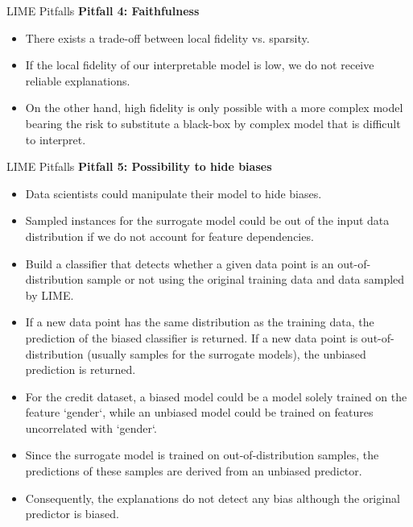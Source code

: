\documentclass[aspectratio=169]{../latex_main/tntbeamer}  %
\begin{document}
\begin{frame}[c]{LIME Pitfalls }
\textbf{Pitfall 4: Faithfulness}
\begin{itemize}
	\item There exists a trade-off between local fidelity vs. sparsity. 
	\item If the local fidelity of our interpretable model is low, we do not receive reliable explanations.
	\item On the other hand, high fidelity is only possible with a more complex model bearing the risk to substitute a black-box by complex model that is difficult to interpret.
\end{itemize}

\end{frame}
\begin{frame}{LIME Pitfalls }
\vspace{-1em}
\textbf{Pitfall 5: Possibility to hide biases}
\begin{itemize}
	\item Data scientists could manipulate their model to hide biases. 
	\item Sampled instances for the surrogate model could be out of the input data distribution if we do not account for feature dependencies. 
	\pause
	\item Build a classifier that detects whether a given data point is an out-of-distribution sample or not using the original training data and data sampled by LIME. 
	\item If a new data point has the same distribution as the training data, the prediction of the biased classifier is returned. If a new data point is out-of-distribution (usually samples for the surrogate models), the unbiased prediction is returned.
	\pause
	\item For the credit dataset, a biased model could be a model solely trained on the feature `gender`, while an unbiased model could be trained on features uncorrelated with `gender`.
	\item Since the surrogate model is trained on out-of-distribution samples, the predictions of these samples are derived from an unbiased predictor. 
	\item Consequently, the explanations do not detect any bias although the original predictor is biased. 
\end{itemize}
\end{frame}
\end{document}
